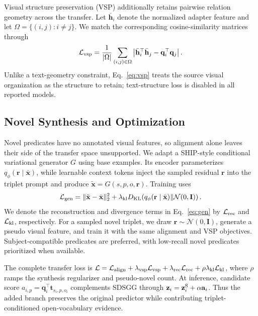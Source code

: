 Visual structure preservation (VSP) additionally retains pairwise relation
geometry across the transfer. Let $\bar{\mathbf h}_i$ denote the normalized
adapter feature and let $\Omega=\{(i,j):i\ne j\}$. We match the corresponding
cosine-similarity matrices through
\begin{equation}
 \mathcal L_{\rm vsp}=\frac{1}{|\Omega|}\sum_{(i,j)\in\Omega}
 \left|\bar{\mathbf h}_i^\top\bar{\mathbf h}_j-
 \mathbf q_i^\top\mathbf q_j\right|.
 \label{eq:vsp}
\end{equation}
Unlike a text-geometry constraint, Eq.~\eqref{eq:vsp} treats the source visual
organization as the structure to retain; text-structure loss is disabled in
all reported models.

\subsection{Novel Synthesis and Optimization}
\label{sec:novel_synthesis}

Novel predicates have no annotated visual features, so alignment alone leaves
their side of the transfer space unsupported. We adapt a SHIP-style
conditional variational generator $G$ using base examples. Its encoder
parameterizes $q_\phi(\mathbf r\mid\bar{\mathbf x})$, while learnable context
tokens inject the sampled residual $\mathbf r$ into the triplet prompt and
produce $\tilde{\mathbf x}=G(s,p,o,\mathbf r)$. Training uses
\begin{equation}
 \mathcal L_{\rm gen}=\|\tilde{\mathbf x}-\bar{\mathbf x}\|_2^2+
 \lambda_{\rm kl}D_{\rm KL}\!\left(q_\phi(\mathbf r\mid\bar{\mathbf x})
 \|\mathcal N(0,\mathbf I)\right).
 \label{eq:gen}
\end{equation}
We denote the reconstruction and divergence terms in Eq.~\eqref{eq:gen} by
$\mathcal L_{\rm rec}$ and $\mathcal L_{\rm kl}$, respectively.
For a sampled novel triplet, we draw $\mathbf r\sim\mathcal N(0,\mathbf I)$,
generate a pseudo visual feature, and train it with the same alignment and VSP
objectives. Subject-compatible predicates are preferred, with low-recall
novel predicates prioritized when available.

The complete transfer loss is
$\mathcal L=\mathcal L_{\rm align}+\lambda_{\rm vsp}\mathcal L_{\rm vsp}
+\lambda_{\rm rec}\mathcal L_{\rm rec}+\rho\lambda_{\rm kl}\mathcal L_{\rm kl}$,
where $\rho$ ramps the synthesis regularizer and pseudo-novel count.
At inference, candidate score
$a_{i,p}=\mathbf q_i^\top\mathbf t_{s_i,p,o_i}$ complements SDSGG through
$\mathbf z_i=\mathbf z_i^{\rm S}+\alpha\mathbf a_i$. Thus the added branch
preserves the original predictor while contributing triplet-conditioned
open-vocabulary evidence.
